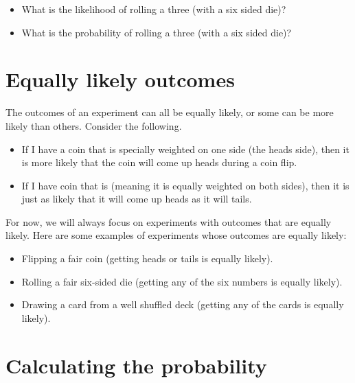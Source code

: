 \documentclass[../../../main.tex]{subfiles}
\begin{document}
\begin{itemize}
  \item What is the likelihood of rolling a three (with a six sided die)?
  \item What is the probability of rolling a three (with a six sided die)? 
\end{itemize}


\section{Equally likely outcomes}

The outcomes of an experiment can all be equally likely, or some can be more likely than others. Consider the following.

\begin{itemize}

  \item If I have a coin that is specially weighted on one side (the heads side), then it is more likely that the coin will come up heads during a coin flip. 

  \item If I have coin that is  (meaning it is equally weighted on both sides), then it is just as likely that it will come up heads as it will tails.
  
\end{itemize}

\noindent
For now, we will always focus on experiments with outcomes that are equally likely. Here are some examples of experiments whose outcomes are equally likely:

\begin{itemize}
  \item Flipping a fair coin (getting heads or tails is equally likely).
  \item Rolling a fair six-sided die (getting any of the six numbers is equally likely).
  \item Drawing a card from a well shuffled deck (getting any of the cards is equally likely).
\end{itemize}


\section{Calculating the probability}
\end{document}
